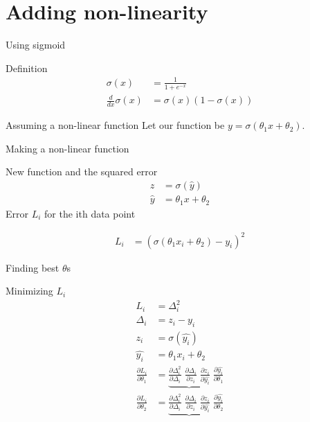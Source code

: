 \section{Adding non-linearity}
\begin{frame}{Using sigmoid}
	\begin{block}{Definition}
		\begin{align}
			\sigma(x)  &= \frac{1}{1+e^{-x}}  \\
			\frac{d}{d x}\sigma(x) & =  \sigma(x) (1-\sigma(x))
		\end{align}
	\end{block}
	\begin{block}{Assuming a non-linear function}
		Let our function be $y=\sigma(\theta_1 x+\theta_2)$. 
	\end{block}
\end{frame}
\begin{frame}{Making a non-linear function}
	\begin{block}{New function and the squared error}  
	\begin{align}
	z&=\sigma(\hat{y}) \\
	\hat{y} &= \theta_1 x+\theta_2  
	\end{align}
	Error $L_i$ for the ith data point 
	
	\begin{align}
	L_i&=(\sigma(\theta_1 x_i+\theta_2) - y_i)^2   
	\end{align}
	
\end{block}
\end{frame}
\begin{frame}{Finding best $\theta$s}
\begin{block}{Minimizing $L_i$}
	\begin{align}
		L_i &=\Delta_i^2 \\
	\Delta_i &= z_i-y_i \\
	z_i&=\sigma(\hat{y_i}) \\
	\hat{y_i} &= \theta_1 x_i+\theta_2  \\
	\frac{\partial L_i}{\partial \theta_1} &=
	\underbrace{ 
	\frac{\partial \Delta_i^2}{\partial \Delta_i} \; 
	\frac{\partial \Delta_i}{\partial z_i}  \;
	\frac{\partial z_i}{\partial \hat{y_i}} }\;
	\frac{\partial \hat{y_i}}{\partial \theta_1} \\
	\frac{\partial L_i}{\partial \theta_2} &=
	\underbrace{ 
	\frac{\partial \Delta_i^2}{\partial \Delta_i} \;  
	\frac{\partial \Delta_i}{\partial z_i}  \;
	\frac{\partial z_i}{\partial \hat{y_i}} } \;
	\frac{\partial \hat{y_i}}{\partial \theta_2} 
	\end{align}
\end{block}
\end{frame}
